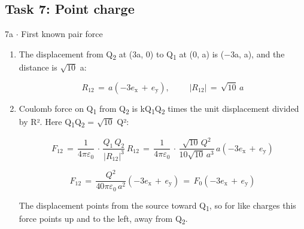 \documentclass[11pt]{article}
\begin{document}
\begin{keepsection}\subsection{Task 7: Point charge}

\begin{workedbox}{7a \ensuremath{\cdot} First known pair force}
\begin{enumerate}
\item {}
The displacement from Q\textsubscript{2} at (3a, 0) to Q\textsubscript{1} at (0, a) is (\ensuremath{-}3a, a), and the distance is \ensuremath{\sqrt{10}} a:

\begin{equation*}{R}_{12}\, =\, {a}(-3{e}_{\mathrm{x}}\, +\, {e}_{\mathrm{y}}),\quad \, \quad \, |{R}_{12}|\, =\, \sqrt{10}\, {a}\end{equation*}
\item {}
Coulomb force on Q\textsubscript{1} from Q\textsubscript{2} is kQ\textsubscript{1}Q\textsubscript{2} times the unit displacement divided by R². Here Q\textsubscript{1}Q\textsubscript{2} = \ensuremath{\sqrt{10}} Q²:

\begin{equation*}{F}_{12}\, =\, \dfrac{1}{4πε_{0}}\, \cdot \, \dfrac{{Q}_{1}\, {Q}_{2}}{|{R}_{12}|^{3}}\, {R}_{12}\, =\, \dfrac{1}{4πε_{0}}\, \cdot \, \dfrac{\sqrt{10}\, {Q}^{2}}{10\sqrt{10}\, {a}^{3}}\, {a}(-3{e}_{\mathrm{x}}\, +\, {e}_{\mathrm{y}})\end{equation*}

\begin{equation*}{F}_{12}\, =\, \dfrac{{Q}^{2}}{40πε_{0}\, {a}^{2}}(-3{e}_{\mathrm{x}}\, +\, {e}_{\mathrm{y}})\, =\, {F}_{0}(-3{e}_{\mathrm{x}}\, +\, {e}_{\mathrm{y}})\end{equation*}

The displacement points from the source toward Q\textsubscript{1}, so for like charges this force points up and to the left, away from Q\textsubscript{2}.
\end{enumerate}
\end{workedbox}

\end{keepsection}
\end{document}
